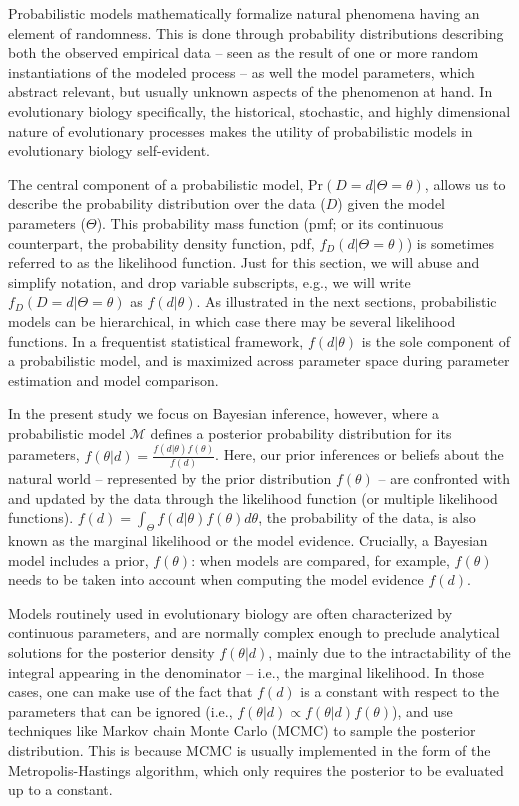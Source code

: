\documentclass[oneside]{article}
\begin{document}
Probabilistic models mathematically formalize natural phenomena
having an element of randomness.
This is done through probability distributions describing both the observed
empirical data -- seen as the result of one or more random instantiations of the modeled process -- as well the model parameters, which abstract relevant, but usually unknown aspects of the phenomenon at hand.
In evolutionary biology specifically, the historical, stochastic, and highly dimensional nature of evolutionary processes makes the utility of probabilistic models in evolutionary biology self-evident. 

The central component of a probabilistic model, $\text{Pr}(D=d|\Theta=\theta)$, allows us to describe the probability distribution over the data ($D$) given the model parameters ($\Theta$).
This probability mass function (pmf; or its continuous counterpart, the probability density function, pdf, $f_D(d|\Theta=\theta)$) is sometimes referred to as the likelihood function.
Just for this section, we will abuse and simplify notation, and drop variable subscripts, e.g., we will write $f_D(D=d|\Theta=\theta)$  as $f(d|\theta)$.
As illustrated in the next sections, probabilistic models can be hierarchical, in which case there may be several likelihood functions.
In a frequentist statistical framework, $f(d|\theta)$ is the sole component of a probabilistic model, and is maximized across parameter space during parameter estimation and model comparison.

In the present study we focus on Bayesian inference, however, where a probabilistic model $\mathcal{M}$ defines a posterior  probability distribution for its parameters, $f(\theta|d) = \frac{f(d|\theta)f(\theta)}{f(d)}$.
Here, our prior inferences or beliefs about the natural world -- represented by the prior distribution $f(\theta)$ -- are confronted with and updated by the data through the likelihood function (or multiple likelihood functions).
$f(d) = \int_\Theta f(d|\theta)f(\theta)d\theta$, the probability of the data, is also known as the marginal likelihood or the model evidence.
Crucially, a Bayesian model includes a prior, $f(\theta)$: when models are compared, for example, $f(\theta)$ needs to be taken into account when computing the model evidence $f(d)$.

Models routinely used in evolutionary biology are often characterized by continuous parameters, and are normally complex enough to preclude analytical solutions for the posterior density $f(\theta|d)$, mainly due to the intractability of the integral appearing in the denominator -- i.e., the marginal likelihood.
In those cases, one can make use of the fact that $f(d)$ is a constant with respect to the parameters that can be ignored (i.e., $f(\theta|d) \propto f(\theta|d)f(\theta)$), and use techniques like Markov chain Monte Carlo (MCMC) to sample the posterior distribution.
This is because MCMC is usually implemented in the form of the Metropolis-Hastings \citep{metropolis53,mh} algorithm, which only requires the posterior to be evaluated up to a constant.
\end{document}
